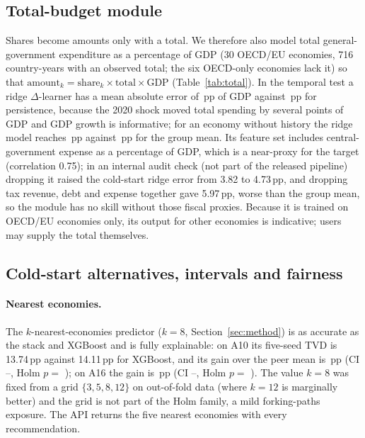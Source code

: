 \subsection{Total-budget module}\label{sec:total}
Shares become amounts only with a total. We therefore also model total general-government expenditure as a percentage of GDP (30 OECD/EU economies, 716 country-years with an observed total; the six OECD-only economies lack it) so that $\text{amount}_k=\text{share}_k\times\text{total}\times\text{GDP}$ (Table~\ref{tab:total}). In the temporal test a ridge $\Delta$-learner has a mean absolute error of \TotDeltaRidge\,pp of GDP against \TotPersist\,pp for persistence, because the 2020 shock moved total spending by several points of GDP and GDP growth is informative; for an economy without history the ridge model reaches \TotColdRidge\,pp against \TotColdMean\,pp for the group mean. Its feature set includes central-government expense as a percentage of GDP, which is a near-proxy for the target (correlation 0.75); in an internal audit check (not part of the released pipeline) dropping it raised the cold-start ridge error from 3.82 to 4.73\,pp, and dropping tax revenue, debt and expense together gave 5.97\,pp, worse than the group mean, so the module has no skill without those fiscal proxies. Because it is trained on OECD/EU economies only, its output for other economies is indicative; users may supply the total themselves.



\subsection{Cold-start alternatives, intervals and fairness}\label{sec:ext}
\paragraph{Nearest economies.} The $k$-nearest-economies predictor ($k=8$, Section~\ref{sec:method}) is as accurate as the stack and XGBoost and is fully explainable: on A10 its five-seed TVD is 13.74\,pp against 14.11\,pp for XGBoost, and its gain over the peer mean is \FSKnnTenGain\,pp (CI \FSKnnTenLo--\FSKnnTenHi, Holm $p=$ \FSKnnTenHolm); on A16 the gain is \FSKnnSixteenGain\,pp (CI \FSKnnSixteenLo--\FSKnnSixteenHi, Holm $p=$ \FSKnnSixteenHolm). The value $k=8$ was fixed from a grid $\{3,5,8,12\}$ on out-of-fold data (where $k=12$ is marginally better) and the grid is not part of the Holm family, a mild forking-paths exposure. The API returns the five nearest economies with every recommendation.
